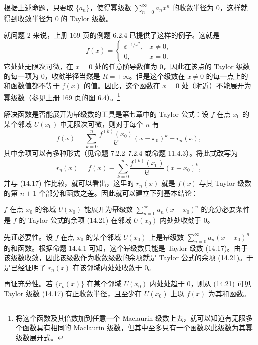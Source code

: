 \begin{xremark}
根据上述命题，只要取 $\{a_n\}$，使得幂级数 $\displaystyle\sum_{n=0}^{\infty}a_nx^n$ 的收敛半径为 $0$，这样就得到收敛半径为 $0$ 的 Taylor 级数。
\end{xremark}

就问题 2 来说，上册 169 页的例题 6.2.4 已提供了这样的例子。这就是
\[
  f(x)=
  \begin{cases}
    \ee^{-1/x^2},& x\ne0,\\
    0,& x=0.
  \end{cases}
\]
它处处无限次可微，在 $x=0$ 处的任意阶导数值为 $0$，因此在该点的 Taylor 级数的每一项为 $0$，收敛半径当然是 $R=+\infty$。但是这个级数在 $x\ne0$ 的每一点上的和函数值都不等于 $f(x)$ 的值。因此，这个函数在 $x=0$ 处（附近）不能展开为幂级数（参见上册 169 页的图 6.4）。\footnote{将这个函数及其倍数加到任意一个 Maclaurin 级数上去，就可以知道有无限多个函数具有相同的 Maclaurin 级数，但其中至多只有一个函数以此级数为其幂级数展开式。}

解决函数是否能展开为幂级数的工具是第七章中的 Taylor 公式：设 $f$ 在点 $x_0$ 的某个邻域 $U(x_0)$ 中无限次可微，则对于每个 $n$ 有
\[
  f(x)=\sum_{k=0}^{n}\frac{f^{(k)}(x_0)}{k!}(x-x_0)^k+r_n(x),
\]
其中余项可以有多种形式（见命题 7.2.2--7.2.4 或命题 11.4.3）。将此式改写为
\begin{equation}
  r_n(x)=f(x)-\sum_{k=0}^{n}\frac{f^{(k)}(x_0)}{k!}(x-x_0)^k,
  \tag{14.21}
  \label{eq:14.21}
\end{equation}
并与 (14.17) 作比较，就可以看出，这里的 $r_n(x)$ 就是 $f(x)$ 与其 Taylor 级数的第 $n+1$ 个部分和函数之差。因此就可以建立下列基本结论：

\begin{xproposition}[14.4.3]
$f$ 在点 $x_0$ 的邻域 $U(x_0)$ 能展开为幂级数 $\displaystyle\sum_{n=0}^{\infty}a_n(x-x_0)^n$ 的充分必要条件是 $f$ 的 Taylor 公式的余项 (14.21) 在邻域 $U(x_0)$ 内处处收敛于 $0$。
\end{xproposition}
\begin{xproof}
先证必要性。设 $f$ 在点 $x_0$ 的某个邻域 $U(x_0)$ 上是幂级数 $\displaystyle\sum_{n=0}^{\infty}a_n(x-x_0)^n$ 的和函数。根据命题 14.4.1 可知，这个幂级数只能是 Taylor 级数 (14.17)。由于该级数收敛，因此该级数作为收敛级数的余项就是 Taylor 公式的余项 (14.21)。于是已经证明了 $r_n(x)$ 在该邻域内处处收敛于 $0$。

再证充分性。若 $\{r_n(x)\}$ 在某个邻域 $U(x_0)$ 内处处趋于 $0$，则从 (14.21) 可见 Taylor 级数 (14.17) 有正收敛半径，且至少在 $U(x_0)$ 上以 $f(x)$ 为其和函数。
\end{xproof}

